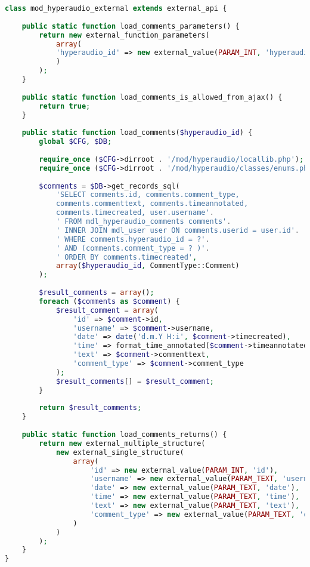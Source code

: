 \begin{lstlisting}[language=php,
             linewidth=\textwidth,
             caption={Ausschnitt der \textbf{external.php} in der 4. Iteration},
             label={lst:it4:external}]
class mod_hyperaudio_external extends external_api {
    
    public static function load_comments_parameters() {
        return new external_function_parameters(
            array(
            'hyperaudio_id' => new external_value(PARAM_INT, 'hyperaudio_id')
            )
        );
    }
    
    public static function load_comments_is_allowed_from_ajax() {
        return true;
    }
    
    public static function load_comments($hyperaudio_id) {
        global $CFG, $DB;
        
        require_once ($CFG->dirroot . '/mod/hyperaudio/locallib.php');
        require_once ($CFG->dirroot . '/mod/hyperaudio/classes/enums.php');
        
        $comments = $DB->get_records_sql(
            'SELECT comments.id, comments.comment_type,
            comments.commenttext, comments.timeannotated,
            comments.timecreated, user.username'.
            ' FROM mdl_hyperaudio_comments comments'.
            ' INNER JOIN mdl_user user ON comments.userid = user.id'.
            ' WHERE comments.hyperaudio_id = ?'.
            ' AND (comments.comment_type = ? )'.
            ' ORDER BY comments.timecreated',
            array($hyperaudio_id, CommentType::Comment)
        );
        
        $result_comments = array();
        foreach ($comments as $comment) {
            $result_comment = array(
                'id' => $comment->id,
                'username' => $comment->username,
                'date' => date('d.m.Y H:i', $comment->timecreated),
                'time' => format_time_annotated($comment->timeannotated),
                'text' => $comment->commenttext,
                'comment_type' => $comment->comment_type
            );
            $result_comments[] = $result_comment;
        }
        
        return $result_comments;
    }
    
    public static function load_comments_returns() {
        return new external_multiple_structure(
            new external_single_structure(
                array(
                    'id' => new external_value(PARAM_INT, 'id'),
                    'username' => new external_value(PARAM_TEXT, 'username'),
                    'date' => new external_value(PARAM_TEXT, 'date'),
                    'time' => new external_value(PARAM_TEXT, 'time'),
                    'text' => new external_value(PARAM_TEXT, 'text'),
                    'comment_type' => new external_value(PARAM_TEXT, 'comment_type')
                )
            )
        );
    }
}             
\end{lstlisting}

